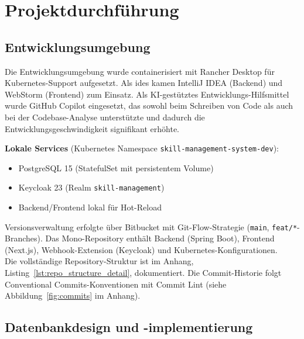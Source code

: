 \chapter{Projektdurchführung}

\section{Entwicklungsumgebung}

Die Entwicklungsumgebung wurde containerisiert mit Rancher Desktop\cite{rancher_docs} für Kubernetes\cite{kubernetes_docs}-Support aufgesetzt. Als \glspl{ide} kamen IntelliJ IDEA (Backend) und WebStorm (Frontend)\cite{intellij_docs,webstorm_docs} zum Einsatz. Als KI-gestütztes Entwicklungs-Hilfsmittel wurde GitHub Copilot\cite{github_copilot} eingesetzt, das sowohl beim Schreiben von Code als auch bei der Codebase-Analyse unterstützte und dadurch die Entwicklungsgeschwindigkeit signifikant erhöhte.

\textbf{Lokale Services} (Kubernetes Namespace \texttt{skill-management-system-dev}):
\begin{itemize}[noitemsep]
    \item PostgreSQL 15\cite{postgresql_docs} (StatefulSet mit persistentem Volume)
    \item Keycloak 23\cite{keycloak_docs} (Realm \texttt{skill-management})
    \item Backend/Frontend lokal für Hot-Reload
\end{itemize}

Versionsverwaltung erfolgte über Bitbucket\cite{bitbucket_docs} mit Git-Flow-Strategie (\texttt{main}, \texttt{feat/*}-Branches). Das Mono-Repository enthält Backend (Spring Boot\cite{spring_boot_docs}), Frontend (Next.js\cite{nextjs_docs}), Webhook-Extension (Keycloak\cite{keycloak_docs}) und Kubernetes-Konfigurationen. \\
Die vollständige Repository-Struktur ist im Anhang, Listing~\ref{lst:repo_structure_detail}, dokumentiert. Die Commit-Historie folgt Conventional Commits-Konventionen\cite{conventionalcommits} mit Commit Lint (siehe Abbildung~\ref{fig:commits} im Anhang).

\section{Datenbankdesign und -implementierung}

